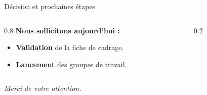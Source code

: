 \documentclass[10pt,aspectratio=169]{beamer}
\begin{document}
\begin{frame}[shrink=10]{Décision et prochaines étapes}
    \vspace{0.3cm}
    \begin{columns}[c]
        \begin{column}{0.8\textwidth}
            {\Large \textbf{\color{ensardark}Nous sollicitons aujourd'hui :}}
            \vspace{0.2cm}
            \begin{itemize}
                \item \normalsize \textbf{Validation} de la fiche de cadrage.
                \item \normalsize \textbf{Lancement} des groupes de travail.
            \end{itemize}
        \end{column}

        \begin{column}{0.2\textwidth}
            \centering
            {\Large\color{ensarorange}}
        \end{column}
    \end{columns}

    \vspace{0.5cm}
    \begin{center}
        {\normalsize\textit{Merci de votre attention.}}
    \end{center}
\end{frame}

\end{document}

